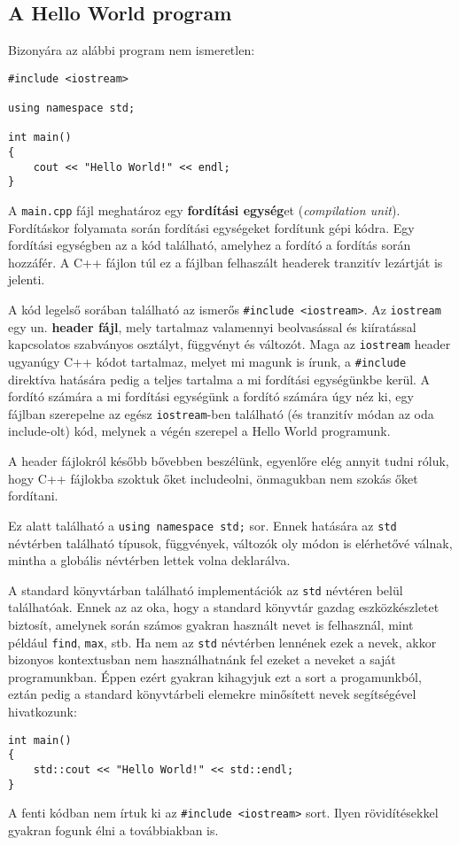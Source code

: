 \documentclass[../cpp_book/cpp_book.tex]{subfiles}
\begin{document}
	\subsection{A Hello World program}
	Bizonyára az alábbi program nem ismeretlen:
	
	\medskip
	
	\begin{lstlisting}
#include <iostream>

using namespace std;
	
int main()
{
	cout << "Hello World!" << endl;
}
	\end{lstlisting}
	A \texttt{main.cpp} fájl meghatároz egy \textbf{fordítási egység}et (\textit{compilation unit}). Fordításkor folyamata során fordítási egységeket fordítunk gépi kódra. Egy fordítási egységben az a kód található, amelyhez a fordító a fordítás során hozzáfér. A C++ fájlon túl ez a fájlban felhaszált headerek tranzitív lezártját is jelenti.
	
	\medskip
	A kód legelső sorában található az ismerős \texttt{\#include <iostream>}. Az \texttt{iostream} egy un. \textbf{header fájl}, mely tartalmaz valamennyi beolvasással és kiíratással kapcsolatos szabványos osztályt, függvényt és változót. Maga az \texttt{iostream} header ugyanúgy C++ kódot tartalmaz, melyet mi magunk is írunk, a \texttt{\#include} direktíva hatására pedig a teljes tartalma a mi fordítási egységünkbe kerül. A fordító számára a mi fordítási egységünk a fordító számára úgy néz ki, egy fájlban szerepelne az egész \texttt{iostream}-ben található (és tranzitív módan az oda include-olt) kód, melynek a végén szerepel a Hello World programunk.
	
	A header fájlokról később bővebben beszélünk, egyenlőre elég annyit tudni róluk, hogy C++ fájlokba szoktuk őket includeolni, önmagukban nem szokás őket fordítani.
	
	\medskip
	Ez alatt található a \texttt{using namespace std;} sor. Ennek hatására az \texttt{std} névtérben található típusok, függvények, változók oly módon is elérhetővé válnak, mintha a globális névtérben lettek volna deklarálva. 
	
	A standard könyvtárban található implementációk az \texttt{std} névtéren belül találhatóak. Ennek az az oka, hogy a standard könyvtár gazdag eszközkészletet biztosít, amelynek során számos gyakran használt nevet is felhasznál, mint például \texttt{find}, \texttt{max}, stb. Ha nem az \texttt{std} névtérben lennének ezek a nevek, akkor bizonyos kontextusban nem használhatnánk fel ezeket a neveket a saját programunkban. Éppen ezért gyakran kihagyjuk ezt a sort a progamunkból, eztán pedig a standard könyvtárbeli elemekre minősített nevek segítségével hivatkozunk:
	\begin{lstlisting}
int main()
{
	std::cout << "Hello World!" << std::endl;
}
	\end{lstlisting}
	\begin{note}
		A fenti kódban nem írtuk ki az \texttt{\#include <iostream>} sort. Ilyen rövidítésekkel gyakran fogunk élni a továbbiakban is. 
	\end{note}
\end{document}
